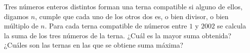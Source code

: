 Tres números enteros distintos forman una terna compatible si alguno de ellos, digamos $n$, cumple que cada uno de los otros dos es, o bien divisor, o bien múltiplo de $n$. Para cada terna compatible de números entre $1$ y $2002$ se calcula la suma de los tres números de la terna. ¿Cuál es la mayor suma obtenida? ¿Cuáles son las ternas en las que se obtiene suma máxima?
